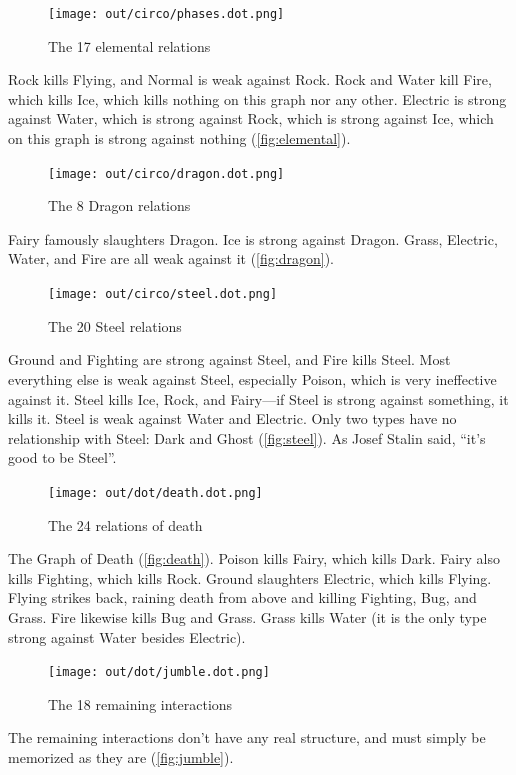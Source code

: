 \begin{figure}[ht]
\centering
\texttt{[image: out/circo/phases.dot.png]}
\caption{The 17 elemental relations\label{fig:elemental}}
\end{figure}
\noindent{}Rock kills Flying, and Normal is weak against Rock.
Rock and Water kill Fire, which kills Ice, which kills nothing on this graph nor any other.
Electric is strong against Water, which is strong against Rock, which is strong against Ice,
 which on this graph is strong against nothing (\autoref{fig:elemental}).
\clearpage

\begin{figure}[t!]
\centering
\texttt{[image: out/circo/dragon.dot.png]}
\caption{The 8 Dragon relations\label{fig:dragon}}
\end{figure}
\noindent{}Fairy famously slaughters Dragon.
Ice is strong against Dragon.
Grass, Electric, Water, and Fire are all weak against it (\autoref{fig:dragon}).

\begin{figure}[h!]
\centering
\texttt{[image: out/circo/steel.dot.png]}
\caption{The 20 Steel relations\label{fig:steel}}
\end{figure}
\noindent{}Ground and Fighting are strong against Steel, and Fire kills Steel.
Most everything else is weak against Steel, especially
 Poison, which is very ineffective against it.
Steel kills Ice, Rock, and Fairy---if Steel is strong against something, it kills it.
Steel is weak against Water and Electric.
Only two types have no relationship with Steel: Dark and Ghost (\autoref{fig:steel}).
As Josef Stalin said, ``it's good to be Steel''.

\begin{figure}[h!]
\centering
\texttt{[image: out/dot/death.dot.png]}
\caption{The 24 relations of death\label{fig:death}}
\end{figure}
\noindent{}The Graph of Death (\autoref{fig:death}).
Poison kills Fairy, which kills Dark.
Fairy also kills Fighting, which kills Rock.
Ground slaughters Electric, which kills Flying.
Flying strikes back, raining death from above and killing Fighting, Bug, and Grass.
Fire likewise kills Bug and Grass.
Grass kills Water (it is the only type strong against Water besides Electric).

\begin{figure}[ht]
\centering
\texttt{[image: out/dot/jumble.dot.png]}
\caption{The 18 remaining interactions\label{fig:jumble}}
\end{figure}
The remaining interactions don't have any real structure, and must simply be
memorized as they are (\autoref{fig:jumble}).

